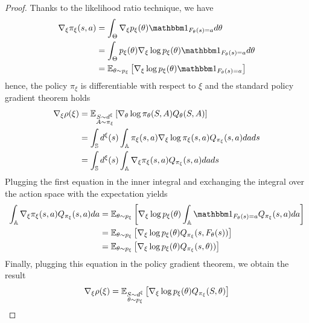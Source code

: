 \begin{proof}
Thanks to the likelihood ratio technique, we have
\begin{equation*}
	\begin{split}
	\nabla_\xi \pi_\xi(s,a) &= \int_\Theta \nabla_\xi p_\xi(\theta) \ind{F_\theta(s)=a} d\theta
		\\
		&= \int_\Theta p_\xi(\theta) \nabla_\xi \log p_\xi(\theta) \ind{F_\theta(s)=a} d\theta
		\\
		&= \E[\theta \sim p_\xi]{\nabla_\xi \log p_\xi(\theta) \ind{F_\theta(s)=a}}
	\end{split}
\end{equation*}
hence, the policy $\pi_\xi$ is differentiable with respect to $\xi$ and the standard policy gradient theorem holds
\begin{equation*}\label{eq:policy_gradient}
	\begin{split}
		\nabla_\xi \rho(\xi) &= \E[\substack{S \sim d^\xi\\A \sim \pi_\xi}]{\nabla_\theta\log
				\pi_\theta(S,A) Q_{\theta}(S, A)}\\
						  &= \int_{\S} d^\xi(s) \int_{\A} \pi_{\xi}(s, a)
		\nabla_{\xi} \log \pi_{\xi}(s,a) Q_{\pi_\xi}(s,a) da ds\\
		&= \int_{\S} d^\xi(s) \int_{\A}
				\nabla_{\xi} \pi_{\xi}(s,a) Q_{\pi_\xi}(s,a) da ds
	\end{split}
\end{equation*}
Plugging the first equation in the inner integral and exchanging the integral over the action space with the expectation yields
\begin{equation*}
	\begin{split}
		 \int_{\A} \nabla_{\xi} \pi_{\xi}(s,a) Q_{\pi_\xi}(s,a) da
			&= \E[\theta \sim p_\xi]{\nabla_\xi \log p_\xi(\theta) \int_\A \ind{F_\theta(s)=a}
			Q_{\pi_\xi}(s,a) da}\\
			&= \E[\theta \sim p_\xi]{\nabla_\xi \log p_\xi(\theta) Q_{\pi_\xi}(s, F_\theta(s))}\\
			&= \E[\theta \sim p_\xi]{\nabla_\xi \log p_\xi(\theta) Q_{\pi_\xi}(s, \theta))}
	\end{split}
\end{equation*}
Finally, plugging this equation in the policy gradient theorem, we obtain the result
\begin{equation*}
	\nabla_\xi \rho(\xi) = \E[\substack{S \sim d^\xi\\\theta \sim p_\xi}]{\nabla_\xi \log p_\xi(\theta) Q_{\pi_\xi}(S, \theta)}
\end{equation*}
\end{proof}
